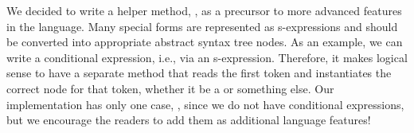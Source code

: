 We decided to write a helper method, , as a precursor to more advanced features in the language. 
Many special forms are represented as s-expressions and should be converted into appropriate abstract syntax tree nodes. 
As an example, we can write a conditional expression, i.e.,  via an s-expression. 
Therefore, it makes logical sense to have a separate method that reads the first token and instantiates the correct node for that token, whether it be a  or something else. 
Our implementation has only one case, , since we do not have conditional expressions, but we encourage the readers to add them as additional language features!
